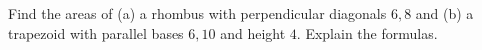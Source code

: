 Find the areas of (a) a rhombus with perpendicular diagonals $6,8$ and (b) a trapezoid with parallel bases $6,10$ and height $4$. Explain the formulas.
